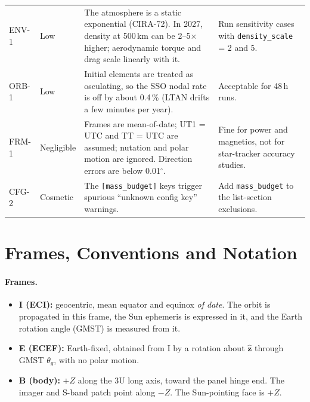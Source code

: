 \documentclass[11pt,a4paper]{article}
\newcommand{\uv}[1]{\hat{\boldsymbol{#1}}}
\newcommand{\code}[1]{\texttt{#1}}
\begin{document}
\begin{longtable}{@{}L{1.3cm}L{1.6cm}L{8.2cm}L{4.4cm}@{}}
ENV-1 & Low & The atmosphere is a static exponential (CIRA-72). In 2027, density at 500\,km can be 2--5$\times$ higher; aerodynamic torque and drag scale linearly with it. & Run sensitivity cases with \code{density\_scale} = 2 and 5.\\
ORB-1 & Low & Initial elements are treated as osculating, so the SSO nodal rate is off by about 0.4\,\% (LTAN drifts a few minutes per year). & Acceptable for 48\,h runs.\\
FRM-1 & Negligible & Frames are mean-of-date; UT1 = UTC and TT = UTC are assumed; nutation and polar motion are ignored. Direction errors are below 0.01$^\circ$. & Fine for power and magnetics, not for star-tracker accuracy studies.\\
CFG-2 & Cosmetic & The \code{[mass\_budget]} keys trigger spurious ``unknown config key'' warnings. & Add \code{mass\_budget} to the list-section exclusions.\\
\bottomrule
\end{longtable}

\section{Frames, Conventions and Notation}

\paragraph{Frames.}
\begin{itemize}
\item \textbf{I (ECI):} geocentric, mean equator and equinox \emph{of date}. The orbit is propagated in this frame, the Sun ephemeris is expressed in it, and the Earth rotation angle (GMST) is measured from it.
\item \textbf{E (ECEF):} Earth-fixed, obtained from I by a rotation about $\uv z$ through GMST $\theta_g$, with no polar motion.
\item \textbf{B (body):} $+Z$ along the 3U long axis, toward the panel hinge end. The imager and S-band patch point along $-Z$. The Sun-pointing face is $+Z$.
\end{itemize}
\end{document}
